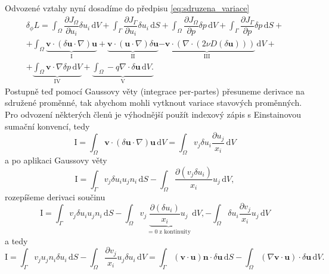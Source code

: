 Odvozené vztahy nyní dosadíme do předpisu \ref{eq:sdruzena_variace}
\begin{multline}
\delta_\phi L = 
\int_{\Omega} \dfrac{\partial J_{\Omega}}{\partial u_i} \delta u_i \, \mathrm{d}V 
+ 
\int_{\Gamma} \dfrac{\partial J_{\Gamma}}{\partial u_i} \delta u_i \, \mathrm{d}S
+
\int_{\Omega} \dfrac{\partial J_{\Omega}}{\partial p} \delta p  \, \mathrm{d}V 
+ 
\int_{\Gamma} \dfrac{\partial J_{\Gamma}}{\partial p} \delta p  \, \mathrm{d}S
+\\+
\int_{\Omega} 
		\underbrace{\mathbf{v} \cdot(\delta \mathbf{u}\cdot \nabla )\mathbf{u}}_\mathrm{I}
		+ \underbrace{\mathbf{v} \cdot(\mathbf{u}\cdot \nabla )\delta\mathbf{u}}_\mathrm{II}
		\underbrace{ - \mathbf{v} \cdot (\nabla \cdot (2\nu D(\delta \mathbf{u}) ))}_\mathrm{III}
\, \mathrm{d}V
+\\+
\underbrace{
\int_{\Omega} 
 \mathbf{v} \cdot \nabla \delta p
\, \mathrm{d}V
}_\mathrm{IV}
+
\underbrace{
\int_{\Omega} 
  - q \nabla \cdot \delta \mathbf{u}
\, \mathrm{d}V.
}_\mathrm{V} 
\end{multline}
Postupně teď pomocí Gaussovy věty (integrace per-partes) přesuneme derivace na sdružené proměnné, tak abychom mohli vytknout variace stavových proměnných. Pro odvození některých členů je výhodnější použít indexový zápis s Einstainovou sumační konvencí, tedy
\begin{equation*}
\mathrm{I}
=
\int_{\Omega} 
\mathbf{v}\cdot(\delta\mathbf{u}\cdot \nabla)\mathbf{u}
\, \mathrm{d}V
=
\int_{\Omega} 
v_j \delta u_i \frac{\partial u_j}{x_i}
\, \mathrm{d}V
\end{equation*}
a po aplikaci Gaussovy věty
\begin{equation*}
\mathrm{I}
=
\int_{\Gamma} 
v_j \delta u_i u_j n_i
\, \mathrm{d}S
-
\int_{\Omega} 
\frac{\partial( v_j \delta u_i )}{x_i}u_j
\, \mathrm{d}V,
\end{equation*}
rozepíšeme derivaci součinu
\begin{equation*}
\mathrm{I}
=
\int_{\Gamma} 
v_j \delta u_i u_j n_i
\, \mathrm{d}S
-
\int_{\Omega} 
v_j\underbrace{\frac{\partial( \delta u_i )}{x_i}u_j}_{=0 \text{ z kontinuity} }
\, \mathrm{d}V,
-
\int_{\Omega} 
\delta u_i \frac{\partial v_j  }{x_i}u_j
\, \mathrm{d}V
\end{equation*} 
a tedy
\begin{equation}\label{eq:clen_I}
\mathrm{I}
=
\int_{\Gamma} 
v_j u_j n_i \delta u_i 
\, \mathrm{d}S
-
\int_{\Omega} 
\frac{\partial v_j  }{x_i} u_j \delta u_i
\, \mathrm{d}V
=
\int_{\Gamma} 
(\mathbf{v}\cdot \mathbf{u} )\mathbf{n} \cdot \delta\mathbf{u}
\, \mathrm{d}S
-
\int_{\Omega} 
(\nabla \mathbf{v}\cdot \mathbf{u})\cdot\delta \mathbf{u}
\, \mathrm{d}V.
\end{equation}
